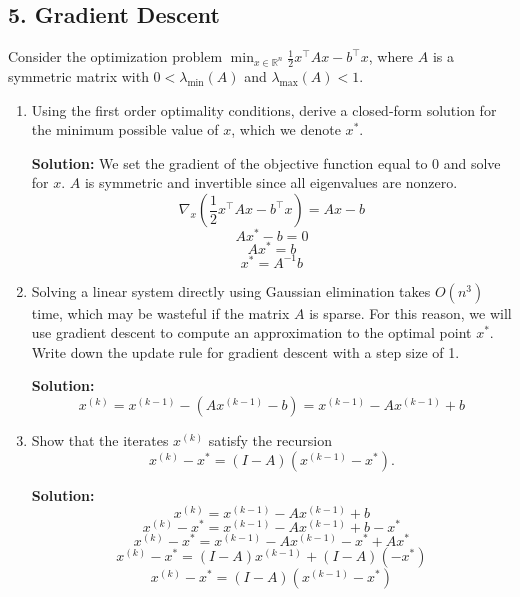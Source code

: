 \documentclass{article}
\newcommand{\solution}{\textbf{Solution: }}
\newcommand{\R}{\mathbb{R}}
\begin{document}
\subsection*{5. Gradient Descent}
Consider the optimization problem $\min_{x \in \R^n} \frac{1}{2} x^{\top} Ax - b^{\top}x$, where $A$ is a symmetric matrix with $0 < \lambda_{\min}(A)$ and $\lambda_{\max} (A) < 1$.
\begin{enumerate}[label=(\alph*)]
    \item Using the first order optimality conditions, derive a closed-form solution for the minimum possible value of $x$, which we denote $x^*$. 
    \begin{mdframed}
    \solution We set the gradient of the objective function equal to 0 and solve for $x$. $A$ is symmetric and invertible since all eigenvalues are nonzero.\\
    $$\nabla_x(\frac{1}{2}x^{\top}Ax-b^{\top}x)=Ax-b$$
    $$Ax^*-b=0$$
    $$Ax^*=b$$
    $$x^*=A^{-1}b$$
    \end{mdframed}
    
    \item Solving a linear system directly using Gaussian elimination takes $O(n^3)$ time, which may be wasteful if the matrix $A$ is sparse. For this reason, we will use gradient descent to compute an approximation to the optimal point $x^*$. Write down the update rule for gradient descent with a step size of 1.
    \begin{mdframed}
    \solution
    $$x^{(k)}=x^{(k-1)}-(Ax^{(k-1)}-b)=x^{(k-1)}-Ax^{(k-1)}+b$$
    \end{mdframed}
    
    \item Show that the iterates $x^{(k)}$ satisfy the recursion $$x^{(k)} - x^* = (I-A)(x^{(k-1)} - x^*).$$
    \begin{mdframed}
    \solution
    $$x^{(k)}=x^{(k-1)}-Ax^{(k-1)}+b$$
    $$x^{(k)}-x^*=x^{(k-1)}-Ax^{(k-1)}+b-x^*$$
    $$x^{(k)}-x^*=x^{(k-1)}-Ax^{(k-1)}-x^*+Ax^*$$
    $$x^{(k)}-x^*=(I-A)x^{(k-1)}+(I-A)(-x^*)$$
    $$x^{(k)}-x^*=(I-A)(x^{(k-1)}-x^*)$$
    \end{mdframed}
    

\end{enumerate}
\end{document}
